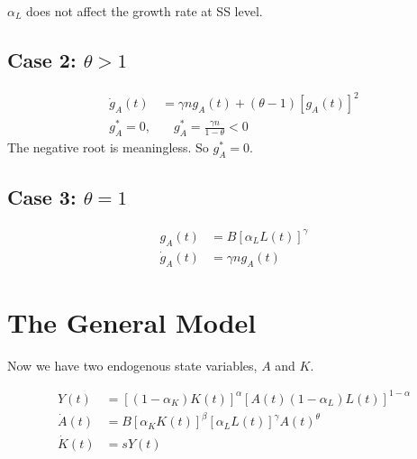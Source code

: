 \documentclass[12pt]{article}
\begin{document}
$ \alpha_{L} $ does not affect the growth rate at SS level.


\subsection{Case 2: $ \theta > 1 $}
\begin{align*}
		\dot{g}_{A}(t) &= \gamma n g_{A}(t) + (\theta - 1)[g_{A}(t)]^{2}\\
		g_{A}^{*} = 0,& \quad g_{A}^{*} =  \frac{\gamma n}{1 - \theta} < 0 
\end{align*}
The negative root is meaningless. So $ g_{A}^{*} = 0 $.

\begin{figure}[H]
\end{figure}

\subsection{Case 3: $ \theta = 1 $}
\begin{align*}
		g_{A}(t)&= B[\alpha_{L}L(t)]^{\gamma}\\
		\dot{g}_{A}(t)&= \gamma n g_{A}(t)
\end{align*}




\section{The General Model}
Now we have two endogenous state variables, $ A $ and $ K $.


\begin{align*}
Y(t) &= \left[ (1 - \alpha_{K}) K(t) \right] ^{\alpha}
\left[ A(t)(1 - \alpha_{L})L(t) \right] ^{1 - \alpha}\\
\dot{A}(t) &= B[\alpha_{K}K(t)]^{\beta}[\alpha_{L}L(t)]^{\gamma}A(t)^{\theta}\\
\dot{K}(t) &= sY(t)
\end{align*}
\end{document}
